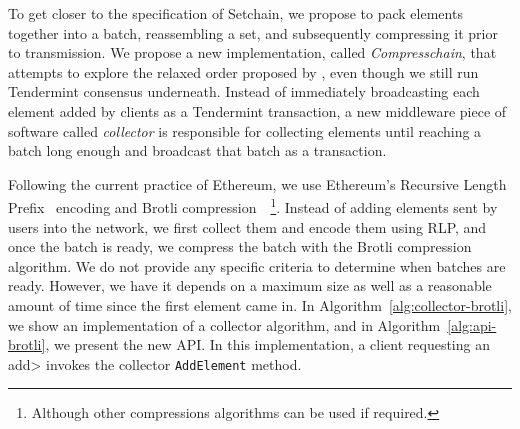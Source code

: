 To get closer to the specification of Setchain, we propose to pack elements
together into a batch, reassembling a set, and subsequently compressing it
prior to transmission.
%
We propose a new implementation, called \emph{Compresschain}, that attempts to
explore the relaxed order proposed by \setchain, even though we still run
Tendermint consensus underneath.
%
Instead of immediately broadcasting each element added by clients as a
Tendermint transaction, a new middleware piece of software called
\textit{collector} is responsible for collecting elements until reaching a batch
long enough and broadcast that batch as a transaction.
%
%

Following the current practice of Ethereum, we use Ethereum's Recursive Length
Prefix~\cite{ethereum} encoding and Brotli
compression~\cite{brotli.compressor}~\footnote{ Although other compressions
algorithms can be used if required.}.
%
%
Instead of adding elements sent by users into the network, we first collect them
and encode them using RLP, and once the batch is ready, we compress the batch
with the Brotli compression algorithm.
%
We do not provide any specific criteria to determine when batches are ready.
%
However, we have it depends on a maximum size as well as a reasonable amount of
time since the first element came in.
%
In Algorithm~\ref{alg:collector-brotli}, we show an implementation of a
collector algorithm, and in Algorithm~\ref{alg:api-brotli}, we present the new
\setchain API.
%
In this implementation, a client requesting an \<add> invokes the
collector \texttt{AddElement} method.
%





%


